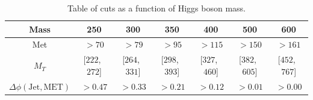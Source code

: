 \begin{table}[!ht]
\begin{center}
\begin{tabular}{c|cccccc}\hline
Mass & 250 & 300 & 350 & 400 & 500 & 600 \\ \hline 
Met & $>   70$ & $>   79$ & $>   95$ & $>  115$ & $>  150$ & $>  161$ \\ 
 $M_T$ & [$ 222$,~$ 272$] & [$ 264$,~$ 331$] & [$ 298$,~$ 393$] & [$ 327$,~$ 460$] & [$ 382$,~$ 605$] & [$ 452$,~$ 767$] \\ 
 $\Delta\phi(\mathrm{Jet}, \mathrm{MET})$ & $> 0.47$ & $> 0.33$ & $> 0.21$ & $> 0.12$ & $> 0.01$ & $> 0.00$ \\ \hline
 \end{tabular}
\caption{Table of cuts as a function of Higgs boson mass.}
\label{tab:cut_selection}
\end{center}
\end{table}

